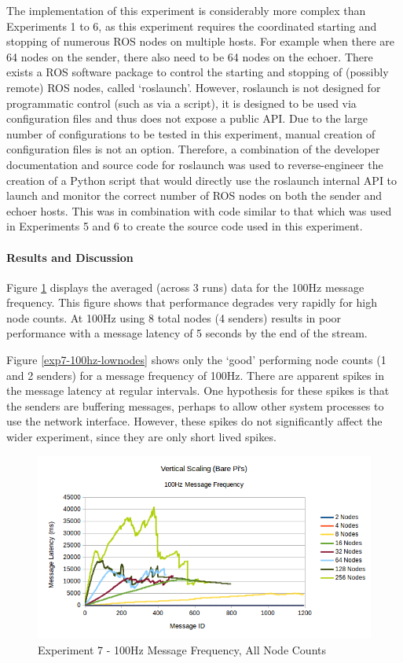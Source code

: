 \documentclass[../dissertation.tex]{subfiles}
\begin{document}
The implementation of this experiment is considerably more complex than Experiments 1 to 6, as this experiment requires the coordinated starting and stopping of numerous ROS nodes on multiple hosts. For example when there are 64 nodes on the sender, there also need to be 64 nodes on the echoer. There exists a ROS software package to control the starting and stopping of (possibly remote) ROS nodes, called `roslaunch'. However, roslaunch is not designed for programmatic control (such as via a script), it is designed to be used via configuration files and thus does not expose a public API. Due to the large number of configurations to be tested in this experiment, manual creation of configuration files is not an option. Therefore, a combination of the developer documentation and source code for roslaunch was used to reverse-engineer the creation of a Python script that would directly use the roslaunch internal API to launch and monitor the correct number of ROS nodes on both the sender and echoer hosts\cite{Experiment7ROSlaunchScript}. This was in combination with code similar to that which was used in Experiments 5 and 6 to create the source code used in this experiment\cite{Experiment7Code}.

\paragraph{Results and Discussion} Figure \ref{exp7-100hz-allnodes} displays the averaged (across 3 runs) data for the 100Hz message frequency. This figure shows that performance degrades very rapidly for high node counts. At 100Hz using 8 total nodes (4 senders) results in poor performance with a message latency of 5 seconds by the end of the stream.

Figure \ref{exp7-100hz-lownodes} shows only the `good' performing node counts (1 and 2 senders) for a message frequency of 100Hz. There are apparent spikes in the message latency at regular intervals. One hypothesis for these spikes is that the senders are buffering messages, perhaps to allow other system processes to use the network interface. However, these spikes do not significantly affect the wider experiment, since they are only short lived spikes.

\begin{figure}[H]
\centering
\includegraphics[width=\textwidth]{images/experiment7/vertical_scaling_100hz_all_node_counts.png}
\caption{Experiment 7 - 100Hz Message Frequency, All Node Counts}
\label{exp7-100hz-allnodes}
\end{figure}
\end{document}
